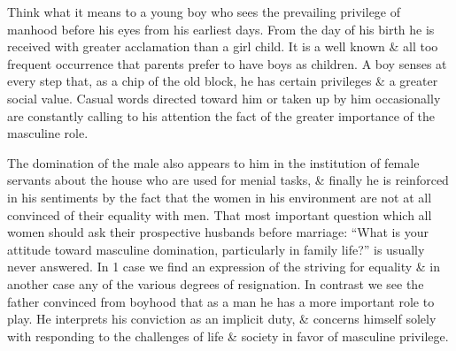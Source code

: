 \documentclass{article}
\begin{document}
Think what it means to a young boy who sees the prevailing privilege of manhood before his eyes from his earliest days. From the day of his birth he is received with greater acclamation than a girl child. It is a well known \& all too frequent occurrence that parents prefer to have boys as children. A boy senses at every step that, as a chip of the old block, he has certain privileges \& a greater social value. Casual words directed toward him or taken up by him occasionally are constantly calling to his attention the fact of the greater importance of the masculine role.

The domination of the male also appears to him in the institution of female servants about the house who are used for menial tasks, \& finally he is reinforced in his sentiments by the fact that the women in his environment are not at all convinced of their equality with men. That most important question which all women should ask their prospective husbands before marriage: ``What is your attitude toward masculine domination, particularly in family life?'' is usually never answered. In 1 case we find an expression of the striving for equality \& in another case any of the various degrees of resignation. In contrast we see the father convinced from boyhood that as a man he has a more important role to play. He interprets his conviction as an implicit duty, \& concerns himself solely with responding to the challenges of life \& society in favor of masculine privilege.
\end{document}
